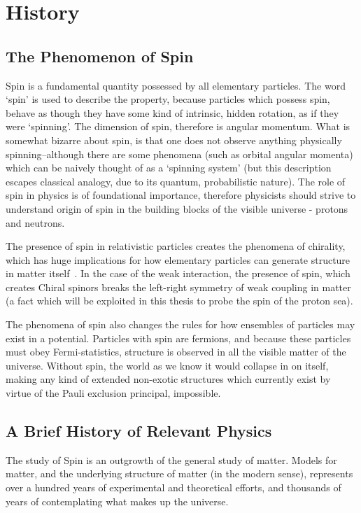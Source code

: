 \chapter{History}
\label{ch:history}
\section{The Phenomenon of Spin}

Spin is a fundamental quantity possessed by all elementary particles. The word
`spin' is used to describe the property, because particles which possess spin,
behave as though they have some kind of intrinsic, hidden rotation, as if they
were `spinning'. The dimension of spin, therefore is angular momentum. What is
somewhat bizarre about spin, is that one does not observe anything physically
spinning--although there are some phenomena (such as orbital angular momenta)
which can be naively thought of as a `spinning system' (but this description
escapes classical analogy, due to its quantum, probabilistic nature). The role
of spin in physics is of foundational importance, therefore physicists should
strive  to understand origin of spin in the building blocks of the visible
universe - protons and neutrons.

The presence of spin in relativistic particles creates the phenomena of
chirality, which has huge implications for how elementary particles can generate
structure in matter itself~\cite{Brodsky1988}. In the case of the weak
interaction, the presence of spin, which creates Chiral spinors breaks the
left-right symmetry of weak coupling in matter (a fact which will be exploited
in this thesis to probe the spin of the proton sea).

The phenomena of spin also changes the rules for how ensembles of particles may
exist in a potential. Particles with spin are fermions, and because these
particles must obey Fermi-statistics, structure is observed in all the visible
matter of the universe. Without spin, the world as we know it would collapse in
on itself, making any kind of extended non-exotic structures which currently
exist by virtue of the Pauli exclusion principal, impossible.

\clearpage
\section{A Brief History of Relevant Physics}

The study of Spin is an outgrowth of the general study of matter.  Models
for matter, and the underlying structure of matter (in the modern sense),
represents over a hundred years of experimental and theoretical efforts, and
thousands of years of contemplating what makes up the universe.

